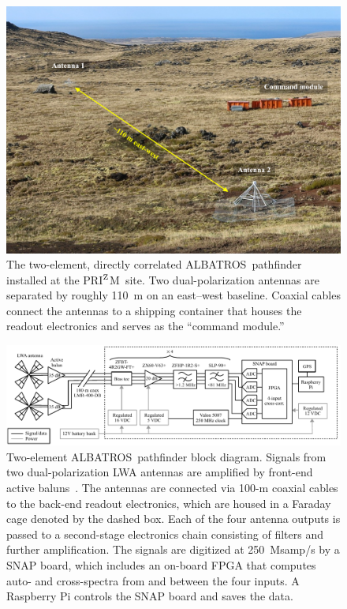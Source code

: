 \documentclass{ws-jai}
\def\albatros{ALBATROS}
\def\prizm{PRI$^{\rm Z}$M}
\begin{document}
\begin{figure}
  \begin{center}
    \includegraphics[width=0.7\linewidth]{Figures/albatros_2elem/albatros_2elem.pdf}
    \caption{The two-element, directly correlated
      \albatros\ pathfinder installed at the \prizm\ site.  Two
      dual-polarization antennas are separated by roughly 110~m on an
      east--west baseline. Coaxial cables connect the antennas to a
      shipping container that houses the readout electronics and
      serves as the ``command module.''}
    \label{Fig:albatros2}
  \end{center}
\end{figure}

\begin{figure}
  \begin{center} \includegraphics[width=1.0\linewidth]{Figures/albatros_2elem_schematic/albatros_2elem_schematic.pdf}
    \caption{Two-element \albatros\ pathfinder block diagram.  Signals
      from two dual-polarization LWA antennas are amplified by
      front-end active baluns~\citep{2012PASP..124.1090H}.  The
      antennas are connected via 100-m coaxial cables to the back-end
      readout electronics, which are housed in a Faraday cage denoted
      by the dashed box.  Each of the four antenna outputs is passed
      to a second-stage electronics chain consisting of filters and
      further amplification.  The signals are digitized at 250~Msamp/s
      by a SNAP board, which includes an on-board FPGA that computes
      auto- and cross-spectra from and between the four inputs.  A
      Raspberry Pi controls the SNAP board and saves the data.}
    \label{Fig:albatros2_schem}
  \end{center}
\end{figure}
\end{document}
